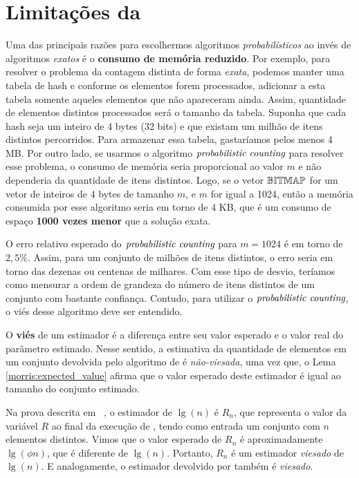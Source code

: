 \section{Limitações da }

Uma das principais razões para escolhermos algoritmos \textit{probabilísticos} ao invés de algoritmos \textit{exatos} é 
o \textbf{consumo de memória reduzido}. Por exemplo, para resolver o problema da contagem distinta de forma 
\textit{exata}, podemos manter uma tabela de hash e conforme os elementos forem processados, adicionar a esta tabela 
somente aqueles elementos que não apareceram ainda. Assim,  quantidade de elementos distintos processados será o tamanho 
da tabela. Suponha que cada hash seja um inteiro de 4 bytes (32 bits) e que existam um milhão de itens distintos 
percorridos. Para armazenar essa tabela, gastaríamos pelos menos 4 MB. Por outro lado, se usarmos o algoritmo 
$\textit{probabilistic counting}$ para resolver esse problema, o consumo de memória seria proporcional ao valor $m$ e não dependeria da 
quantidade de itens distintos. Logo, se o vetor $\mathbb{BITMAP}$ for um vetor de inteiros de 4 bytes de tamanho $m$, e 
$m$ for igual a 1024, então a memória consumida por esse algoritmo seria em torno de 4 KB, que é um consumo de espaço
\textbf{1000 vezes menor} que a solução exata.

O erro relativo esperado do $\textit{probabilistic counting}$ para $m = 1024$ é em torno de $2{,}5\%$. Assim, para um conjunto de milhões de 
itens distintos, o erro seria em torno das dezenas ou centenas de milhares. Com esse tipo de desvio, teríamos como 
mensurar a ordem de grandeza do número de itens distintos de um conjunto com bastante confiança. Contudo, para utilizar
o $\textit{probabilistic counting}$, o viés desse algoritmo deve ser entendido.

O \textbf{viés} de um estimador é a diferença entre seu valor esperado e o valor real do parâmetro estimado. 
Nesse sentido, a estimativa da quantidade de elementos em um conjunto devolvida pelo algoritmo de  é 
\textit{não-viesada}, uma vez que, o Lema \ref{morris:expected_value} afirma que o valor esperado deste estimador é 
igual ao tamanho do conjunto estimado.

Na prova descrita em ~\citep{flajolet:martin:85}, o estimador de $\lg(n)$ é $R_n$, que representa o valor da variável 
$R$ ao final da execução de , tendo como entrada um conjunto com $n$ elementos distintos. 
Vimos que o valor esperado de $R_n$ é aproximadamente $\lg(\phi n)$, que é diferente de $\lg(n)$. Portanto, $R_n$ é um 
estimador \textit{viesado} de $\lg(n)$. E analogamente, o estimador devolvido por  também 
é \textit{viesado}.  

